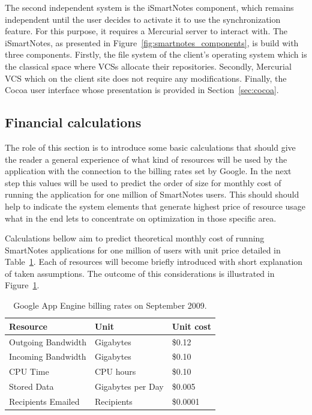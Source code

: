 The second independent system is the iSmartNotes component, which remains independent until the user decides to activate it to use the synchronization feature. For this purpose, it requires a Mercurial server to interact with. The iSmartNotes, as presented in Figure~\ref{fig:smartnotes_components}, is build with three components. Firstly, the file system of the client's operating system which is the classical space where VCSs allocate their repositories. Secondly, Mercurial VCS which on the client site does not require any modifications. Finally, the Cocoa user interface whose presentation is provided in Section~\ref{sec:cocoa}.

\subsection{Financial calculations}\label{subsec:gae_calculations}
The role of this section is to introduce some basic calculations that should give the reader a general experience of what kind of resources will be used by the application with the connection to the billing rates set by Google. In the next step this values will be used to predict the order of size for monthly cost of running the application for  one million of SmartNotes users. This should should help to indicate the system elements that generate highest price of resource usage what in the end lets to concentrate on optimization in those specific area. 

Calculations bellow aim to predict theoretical monthly cost of running SmartNotes applications for one million of users with unit price detailed in Table~\ref{tab:gae_cost}. Each of resources will become briefly introduced with short explanation of taken assumptions. The outcome of this considerations is illustrated in Figure~\ref{tab:gae_cost}.
\begin{table}[h]
\centering
\caption{Google App Engine billing rates on September 2009.}
\label{tab:gae_cost}
\begin{tabular}{|l|l|l|} \hline \hline
\textbf{Resource} & \textbf{Unit} & \textbf{Unit cost} \\ \hline \hline
Outgoing Bandwidth & Gigabytes & \$0.12 \\ \hline
Incoming Bandwidth & Gigabytes & \$0.10 \\ \hline
CPU Time & CPU hours & \$0.10 \\ \hline
Stored Data & Gigabytes per Day & \$0.005 \\ \hline
Recipients Emailed & Recipients & \$0.0001\\ \hline \hline
\end{tabular}
\end{table}

